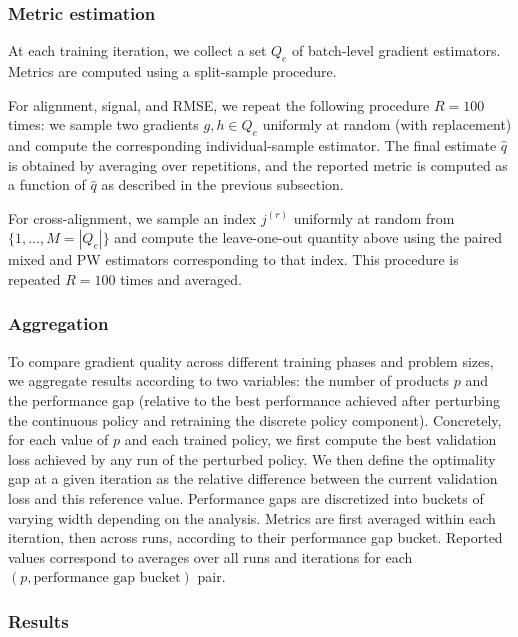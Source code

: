 \documentclass{article}
\theoremstyle{definition}
\theoremstyle{remark}
\begin{document}
\subsubsection{Metric estimation \label{appendix:metric-estimation}}

At each training iteration, we collect a set $Q_e$ of batch-level gradient estimators. Metrics are computed using a split-sample procedure.

For alignment, signal, and RMSE, we repeat the following procedure $R = 100$ times: we sample 
two gradients $g, h \in Q_e$ uniformly at random (with replacement) and compute the corresponding 
individual-sample estimator. The final estimate $\hat{q}$ is obtained by averaging over repetitions, 
and the reported metric is computed as a function of $\hat{q}$ as described in the previous subsection.

For cross-alignment, we sample an index $j^{(r)}$ uniformly at random from $\{1, \dots, M=|Q_e|\}$
and compute the leave-one-out quantity above using the paired mixed and PW estimators
corresponding to that index. This procedure is repeated $R = 100$ times and averaged.


\subsubsection{Aggregation}

To compare gradient quality across different training phases and problem sizes, we aggregate 
results according to two variables: the number of products $p$ and the performance gap (relative 
to the best performance achieved after perturbing the continuous policy and retraining the discrete 
policy component). Concretely, for each value of $p$ and each trained policy, we first compute 
the best validation loss achieved by any run of the perturbed policy. We then define the optimality 
gap at a given iteration as the relative difference between the current validation loss and this 
reference value. Performance gaps are discretized into buckets of varying width depending on the 
analysis. Metrics are first averaged within each iteration, then across runs, according to their 
performance gap bucket. Reported values correspond to averages over all runs and iterations for 
each $(p, \text{performance gap bucket})$ pair.


\subsubsection{Results \label{appendix:gradient-quality-results} }
\end{document}
